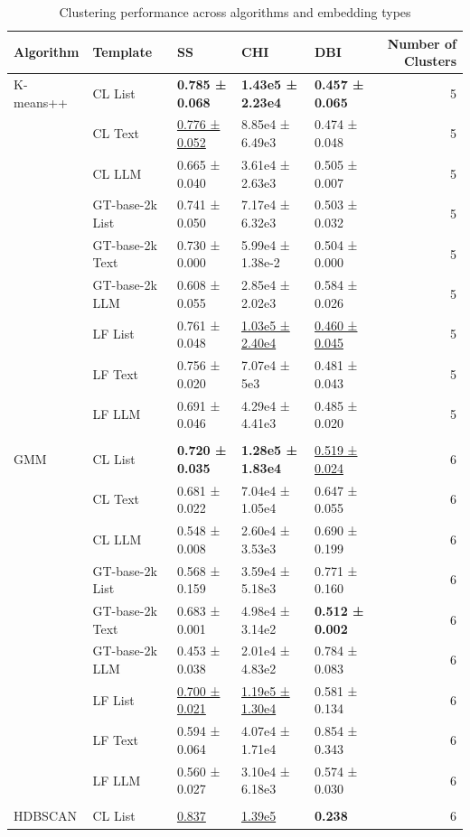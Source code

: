 \begin{table}[!h]
\centering
\caption{Clustering performance across algorithms and embedding types}
\centering
\begin{tabular}[t]{lllllr}
\toprule
Algorithm & Template & SS & CHI & DBI & Number of Clusters\\
\midrule
K-means++ & CL List & \textbf{0.785 ± 0.068} & \textbf{1.43e5 ± 2.23e4} & \textbf{0.457 ± 0.065} & 5\\
 & CL Text & \underline{0.776 ± 0.052} & 8.85e4 ± 6.49e3 & 0.474 ± 0.048 & 5\\
 & CL LLM & 0.665 ± 0.040 & 3.61e4 ± 2.63e3 & 0.505 ± 0.007 & 5\\
 & GT-base-2k List & 0.741 ± 0.050 & 7.17e4 ± 6.32e3 & 0.503 ± 0.032 & 5\\
 & GT-base-2k Text & 0.730 ± 0.000 & 5.99e4 ± 1.38e-2 & 0.504 ± 0.000 & 5\\
\addlinespace
 & GT-base-2k LLM & 0.608 ± 0.055 & 2.85e4 ± 2.02e3 & 0.584 ± 0.026 & 5\\
 & LF List & 0.761 ± 0.048 & \underline{1.03e5 ± 2.40e4} & \underline{0.460 ± 0.045} & 5\\
 & LF Text & 0.756 ± 0.020 & 7.07e4 ± 5e3 & 0.481 ± 0.043 & 5\\
 & LF LLM & 0.691 ± 0.046 & 4.29e4 ± 4.41e3 & 0.485 ± 0.020 & 5\\
\midrule\\
GMM & CL List & \textbf{0.720 ± 0.035} & \textbf{1.28e5 ± 1.83e4} & \underline{0.519 ± 0.024} & 6\\
\addlinespace
 & CL Text & 0.681 ± 0.022 & 7.04e4 ± 1.05e4 & 0.647 ± 0.055 & 6\\
 & CL LLM & 0.548 ± 0.008 & 2.60e4 ± 3.53e3 & 0.690 ± 0.199 & 6\\
 & GT-base-2k List & 0.568 ± 0.159 & 3.59e4 ± 5.18e3 & 0.771 ± 0.160 & 6\\
 & GT-base-2k Text & 0.683 ± 0.001 & 4.98e4 ± 3.14e2 & \textbf{0.512 ± 0.002} & 6\\
 & GT-base-2k LLM & 0.453 ± 0.038 & 2.01e4 ± 4.83e2 & 0.784 ± 0.083 & 6\\
\addlinespace
 & LF List & \underline{0.700 ± 0.021} & \underline{1.19e5 ± 1.30e4} & 0.581 ± 0.134 & 6\\
 & LF Text & 0.594 ± 0.064 & 4.07e4 ± 1.71e4 & 0.854 ± 0.343 & 6\\
 & LF LLM & 0.560 ± 0.027 & 3.10e4 ± 6.18e3 & 0.574 ± 0.030 & 6\\
\midrule\\
HDBSCAN & CL List & \underline{0.837} & \underline{1.39e5} & \textbf{0.238} & 6\\

\end{tabular}
\end{table}
